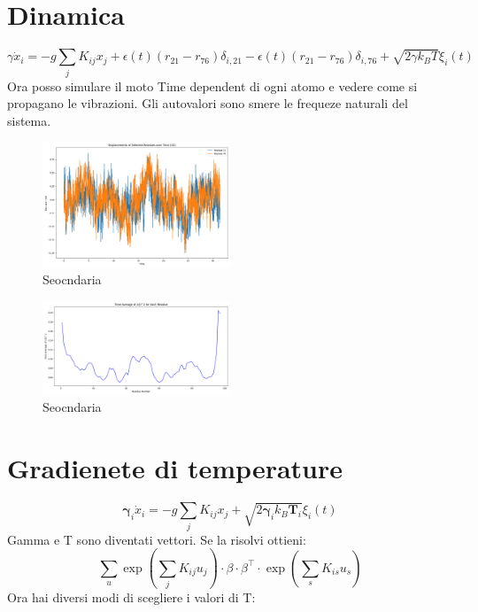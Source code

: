 \documentclass{article}
\begin{document}
\section{Dinamica}
\begin{equation}
    \gamma \dot{x}_i = -g \sum_j K_{ij} x_j + \epsilon(t) (r_{21} - r_{76}) \delta_{i,21} - \epsilon(t) (r_{21} - r_{76}) \delta_{i,76} + \sqrt{2 \gamma k_B T} \xi_i(t)
    \end{equation}
Ora posso simulare il moto Time dependent di ogni atomo e vedere come si propagano le vibrazioni.
Gli autovalori sono smere le frequeze naturali del sistema.
\begin{figure}[H]
    \centering
    \includegraphics[width=0.5\textwidth]{"images/2m10_Processo_stocastico.png"}
    \caption{Seocndaria}
\end{figure}
\begin{figure}[H]
    \centering
    \includegraphics[width=0.5\textwidth]{"images/2m10_Stima beta factors.png"}
    \caption{Seocndaria}
\end{figure}
\section{Gradienete di temperature}
\begin{equation}
    \boldsymbol{\gamma}_i \dot{x}_i = -g \sum_j K_{ij} x_j  + \sqrt{2 \boldsymbol{\gamma}_i k_B \boldsymbol{T}_i} \xi_i(t)
    \end{equation}
Gamma e T sono diventati vettori.
Se la risolvi ottieni:
\begin{equation}
    \sum_{u} \exp\left( \sum_j K_{ij} u_j \right) \cdot \beta \cdot \beta^{\top} \cdot \exp\left( \sum_s K_{is} u_s \right)
    \end{equation}
Ora hai diversi modi di scegliere i valori di T:
\end{document}
